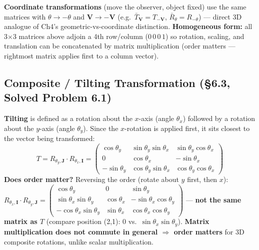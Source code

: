 \documentclass[12pt, a4paper]{article}
\newenvironment{answerbox}{\begin{mdframed}[style=answerframe]}{\end{mdframed}}
\begin{document}
\begin{answerbox}
\textbf{Coordinate transformations} (move the observer, object fixed) use the same matrices with $\theta\to-\theta$ and $\mathbf{V}\to-\mathbf{V}$ (e.g.\ $\bar T_{\mathbf V}=T_{-\mathbf V}$, $\bar R_\theta=R_{-\theta}$) --- direct 3D analogue of Ch4's geometric-vs-coordinate distinction. \textbf{Homogeneous form:} all 3$\times$3 matrices above adjoin a 4th row/column ($0\,0\,0\,1$) so rotation, scaling, and translation can be concatenated by matrix multiplication (order matters --- rightmost matrix applies first to a column vector).
\end{answerbox}

\subsection{Composite / Tilting Transformation (\S6.3, Solved Problem 6.1)}
\begin{answerbox}
\textbf{Tilting} is defined as a rotation about the $x$-axis (angle $\theta_x$) followed by a rotation about the $y$-axis (angle $\theta_y$). Since the $x$-rotation is applied first, it sits closest to the vector being transformed:
$$T = R_{\theta_y,\mathbf{J}}\cdot R_{\theta_x,\mathbf{I}} = \begin{pmatrix}\cos\theta_y & \sin\theta_y\sin\theta_x & \sin\theta_y\cos\theta_x\\ 0 & \cos\theta_x & -\sin\theta_x\\ -\sin\theta_y & \cos\theta_y\sin\theta_x & \cos\theta_y\cos\theta_x\end{pmatrix}$$
\textbf{Does order matter?} Reversing the order (rotate about $y$ first, then $x$): $R_{\theta_x,\mathbf{I}}\cdot R_{\theta_y,\mathbf{J}} = \begin{pmatrix}\cos\theta_y & 0 & \sin\theta_y\\ \sin\theta_x\sin\theta_y & \cos\theta_x & -\sin\theta_x\cos\theta_y\\ -\cos\theta_x\sin\theta_y & \sin\theta_x & \cos\theta_x\cos\theta_y\end{pmatrix}$ --- \textbf{not the same matrix as $T$} (compare position (2,1): $0$ vs.\ $\sin\theta_x\sin\theta_y$). \textbf{Matrix multiplication does not commute in general $\Rightarrow$ order matters} for 3D composite rotations, unlike scalar multiplication.
\end{answerbox}

\end{document}
